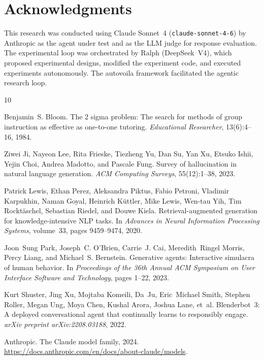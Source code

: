 \documentclass{article}
\begin{document}
\section*{Acknowledgments}

This research was conducted using Claude Sonnet~4 (\texttt{claude-sonnet-4-6})
by Anthropic as the agent under test and as the LLM judge for response
evaluation. The experimental loop was orchestrated by Ralph (DeepSeek~V4),
which proposed experimental designs, modified the experiment code, and executed
experiments autonomously. The autovoila framework facilitated the agentic
research loop.



\begin{thebibliography}{10}

  Benjamin~S. Bloom.
  \newblock The 2 sigma problem: The search for methods of group instruction as
    effective as one-to-one tutoring.
  \newblock \emph{Educational Researcher}, 13(6):4--16, 1984.

  Ziwei Ji, Nayeon Lee, Rita Frieske, Tiezheng Yu, Dan Su, Yan Xu, Etsuko
    Ishii, Yejin Choi, Andrea Madotto, and Pascale Fung.
  \newblock Survey of hallucination in natural language generation.
  \newblock \emph{ACM Computing Surveys}, 55(12):1--38, 2023.

  Patrick Lewis, Ethan Perez, Aleksandra Piktus, Fabio Petroni, Vladimir
    Karpukhin, Naman Goyal, Heinrich K\"{u}ttler, Mike Lewis, Wen-tau Yih,
    Tim Rockt\"{a}schel, Sebastian Riedel, and Douwe Kiela.
  \newblock Retrieval-augmented generation for knowledge-intensive NLP tasks.
  \newblock In \emph{Advances in Neural Information Processing Systems},
    volume~33, pages 9459--9474, 2020.

  Joon~Sung Park, Joseph~C. O'Brien, Carrie~J. Cai, Meredith~Ringel Morris,
    Percy Liang, and Michael~S. Bernstein.
  \newblock Generative agents: Interactive simulacra of human behavior.
  \newblock In \emph{Proceedings of the 36th Annual ACM Symposium on User
    Interface Software and Technology}, pages 1--22, 2023.

  Kurt Shuster, Jing Xu, Mojtaba Komeili, Da~Ju, Eric~Michael Smith, Stephen
    Roller, Megan Ung, Moya Chen, Kushal Arora, Joshua Lane, et~al.
  \newblock Blenderbot~3: A deployed conversational agent that continually
    learns to responsibly engage.
  \newblock \emph{arXiv preprint arXiv:2208.03188}, 2022.

  Anthropic.
  \newblock The Claude model family, 2024.
  \newblock \url{https://docs.anthropic.com/en/docs/about-claude/models}.

\end{thebibliography}
\end{document}
